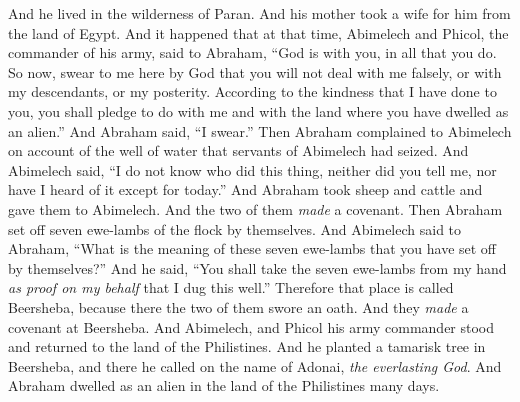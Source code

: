 \begin{biblechapter}
\verse And he lived in the wilderness of Paran. And his mother took a wife for him from the land of Egypt.
 And it happened that at that time, Abimelech and Phicol, the commander of his army, said to Abraham, “God is with you, in all that you do.
\verse So now, swear to me here by God that you will not deal with me falsely, or with my descendants, or my posterity. According to the kindness that I have done to you, you shall pledge to do with me and with the land where you have dwelled as an alien.”
\verse And Abraham said, “I swear.”
\verse Then Abraham complained to Abimelech on account of the well of water that servants of Abimelech had seized.
\verse And Abimelech said, “I do not know who did this thing, neither did you tell me, nor have I heard of it except for today.”
\verse And Abraham took sheep and cattle and gave them to Abimelech. And the two of them \textit{made} a covenant.
\verse Then Abraham set off seven ewe-lambs of the flock by themselves.
\verse And Abimelech said to Abraham, “What is the meaning of these seven ewe-lambs that you have set off by themselves?”
\verse And he said, “You shall take the seven ewe-lambs from my hand \textit{as proof on my behalf} that I dug this well.”
\verse Therefore that place is called Beersheba, because there the two of them swore an oath.
\verse And they \textit{made} a covenant at Beersheba. And Abimelech, and Phicol his army commander stood and returned to the land of the Philistines.
\verse And he planted a tamarisk tree in Beersheba, and there he called on the name of Adonai, \textit{the everlasting God}.
\verse And Abraham dwelled as an alien in the land of the Philistines many days.
\end{biblechapter}

